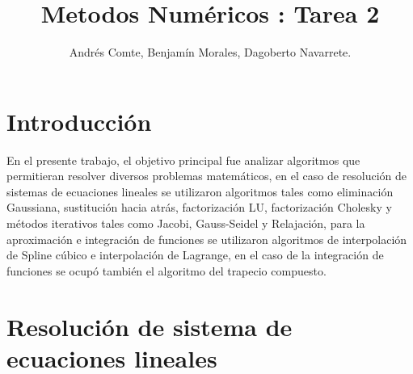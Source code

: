\documentclass{udpreport}
\title{Metodos Numéricos : Tarea 2}
\author{Andrés Comte, Benjamín Morales, Dagoberto Navarrete.}
\begin{document}
\maketitle
\tableofcontents
\listoffigures
\chapter{Introducción}

En el presente trabajo, el objetivo principal fue analizar algoritmos que permitieran resolver diversos problemas matemáticos, en el caso de resolución de sistemas de ecuaciones lineales se utilizaron algoritmos tales como eliminación Gaussiana, sustitución hacia atrás, factorización LU, factorización Cholesky y métodos iterativos tales como Jacobi, Gauss-Seidel y Relajación, para la aproximación e integración de funciones se utilizaron algoritmos de interpolación de Spline cúbico e  interpolación de Lagrange, en el caso de la integración de funciones se ocupó también el algoritmo del trapecio compuesto.

\newpage

\chapter{Resolución de sistema de ecuaciones lineales}
	
\end{document}
